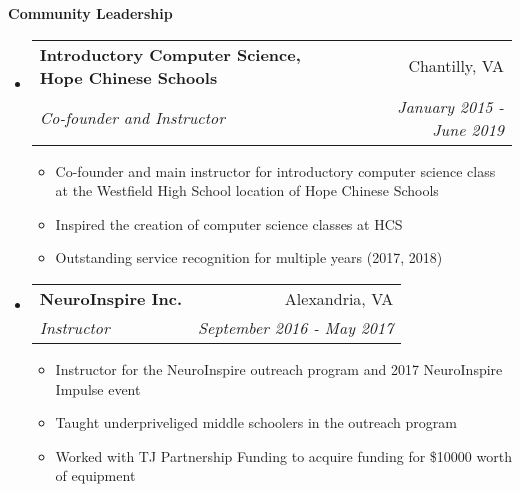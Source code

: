 \documentclass[letterpaper,11pt]{article}
\makeatletter
\newcommand{\resitem}[1]{\item #1 \vspace{-2pt}}
\newcommand{\resheading}[1]{{\large \colorbox{mygrey}{\begin{minipage}{\textwidth}{\textbf{#1 \vphantom{p\^{E}}}}\end{minipage}}}}
\newcommand{\ressubheading}[4]{
\begin{tabular*}{7.0in}{l@{\extracolsep{\fill}}r}
		\textbf{#1} & #2 \\
		\textit{#3} & \textit{#4} \\
\end{tabular*}\vspace{-6pt}}
\makeatother
\begin{document}
\begin{itemize}
\begin{itemize}
	\end{itemize}
	
\end{itemize}

\resheading{Community Leadership}
\begin{itemize}
\item
	\ressubheading{Introductory Computer Science, Hope Chinese Schools}{Chantilly, VA}{Co-founder and Instructor}{January 2015 - June 2019}
	\begin{itemize}
		\resitem{Co-founder and main instructor for introductory computer science class at the Westfield High School location of Hope Chinese Schools}
		\resitem{Inspired the creation of computer science classes at HCS}
	    \resitem{Outstanding service recognition for multiple years (2017, 2018)}
	\end{itemize}
\item
	\ressubheading{NeuroInspire Inc.}{Alexandria, VA}{Instructor}{September 2016 - May 2017}
	\begin{itemize}
		\resitem{Instructor for the NeuroInspire outreach program and 2017 NeuroInspire Impulse event}
		\resitem{Taught underpriveliged middle schoolers in the outreach program}
		\resitem{Worked with TJ Partnership Funding to acquire funding for \$10000 worth of equipment}
	\end{itemize}
	
\end{itemize}
\end{document}
